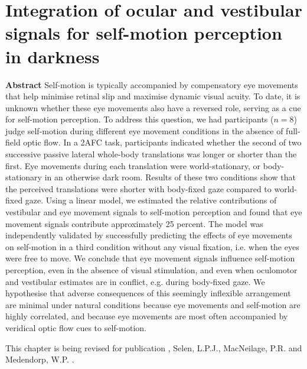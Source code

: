 
\thispagestyle{empty}

\chapter{Integration of ocular and vestibular signals for self-motion perception in darkness}
\chaptermark{}

\label{p3}

\newpage

\small {\bf Abstract} Self-motion is typically accompanied by compensatory eye movements that help minimise retinal slip and maximise dynamic visual acuity. To date, it is unknown whether these eye movements also have a reversed role, serving as a cue for self-motion perception. To address this question, we had participants ($n=8$) judge self-motion during different eye movement conditions in the absence of full-field optic flow.  In a 2AFC task, participants indicated whether the second of two successive passive lateral whole-body translations was longer or shorter than the first. Eye movements during each translation were world-stationary, or body-stationary in an otherwise dark room. Results of these two conditions show that the perceived translations were shorter with body-fixed gaze compared to world-fixed gaze. Using a linear model, we estimated the relative contributions of vestibular and eye movement signals to self-motion perception and found that eye movement signals contribute approximately 25 percent. The model was independently validated by successfully predicting the effects of eye movements on self-motion in a third condition without any visual fixation, i.e. when the eyes were free to move. We conclude that eye movement signals influence self-motion perception, even in the absence of visual stimulation, and even when oculomotor and vestibular estimates are in conflict, e.g. during body-fixed gaze. We hypothesise that adverse consequences of this seemingly inflexible arrangement are minimal under natural conditions because eye movements and self-motion are highly correlated, and because eye movements are most often accompanied by veridical optic flow cues to self-motion.

\vfill

\noindent\underline{ \hspace{4cm} }

\noindent This chapter is being revised for publication \newline
{}, Selen, L.P.J., MacNeilage, P.R. and Medendorp, W.P. \citeyear{clemens2015a}. %

